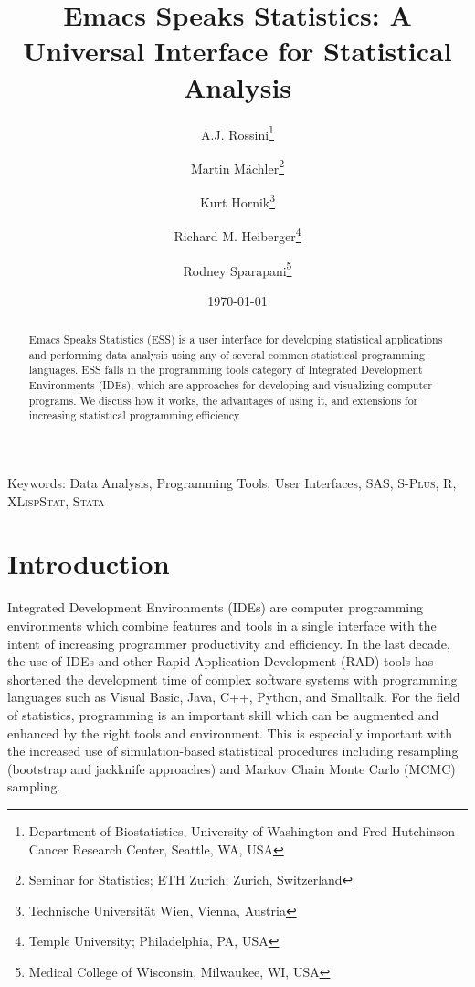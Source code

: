 \documentclass{article}
\title{Emacs Speaks Statistics: A Universal Interface for
  Statistical Analysis}
\author{A.J. Rossini\footnote{Department of Biostatistics, University
    of Washington and Fred Hutchinson Cancer Research Center, Seattle,
    WA, USA} \and Martin M{\"a}chler\footnote{Seminar for Statistics;
    ETH Zurich; Zurich, Switzerland} \and Kurt
  Hornik\footnote{Technische Universit{\"a}t Wien, Vienna, Austria}
  \and Richard M. Heiberger\footnote{Temple University; Philadelphia,
    PA, USA} \and Rodney Sparapani\footnote{Medical College of
    Wisconsin, Milwaukee, WI, USA}}
\date{\today}
\newif\ifpdf
\newcommand*{\Splus}{\textsc{S-Plus}}
\newcommand*{\XLispStat}{\textsc{XLispStat}}
\newcommand*{\Stata}{\textsc{Stata}}
\begin{document}
\ifpdf
  \DeclareGraphicsExtensions{.jpg,.pdf,.png,.mps}
\fi


\singlespace

\maketitle

Keywords: Data Analysis, Programming Tools, User Interfaces, SAS,
\Splus, R, \XLispStat, \Stata

\begin{abstract}
  Emacs Speaks Statistics (ESS) is a user interface for developing
  statistical applications and performing data analysis using any of
  several common statistical programming languages.  ESS falls in the
  programming tools category of Integrated Development Environments
  (IDEs), which are approaches for developing and visualizing computer
  programs.  We discuss how it works, the advantages of using it, and
  extensions for increasing statistical programming efficiency.
\end{abstract}

\doublespace

\section{Introduction}
\label{sec:intro}

Integrated Development Environments (IDEs) are computer programming
environments which combine features and tools in a single interface
with the intent of increasing programmer productivity and efficiency.
In the last decade, the use of IDEs and other Rapid Application 
Development (RAD) tools has shortened the development time of complex 
software systems with programming languages such as Visual
Basic, Java, C++, Python, and Smalltalk.  For the field of statistics,
programming is an important skill which can be augmented and enhanced
by the right tools and environment.  This is especially important with
the increased use of simulation-based statistical procedures including
resampling (bootstrap and jackknife approaches) and Markov Chain Monte
Carlo (MCMC) sampling.
\end{document}
